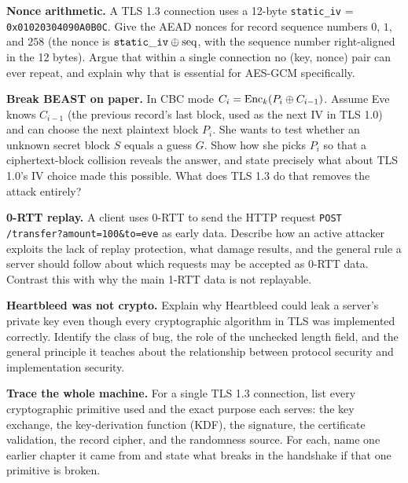 \begin{exercise}
\textbf{Nonce arithmetic.} A TLS 1.3 connection uses a 12-byte
\texttt{static\_iv} = \texttt{0x01020304\allowbreak 090A0B0C}. Give the AEAD nonces
for record sequence numbers $0$, $1$, and $258$ (the nonce is
$\mathtt{static\_iv} \oplus \mathrm{seq}$, with the sequence number right-aligned in
the 12 bytes). Argue that within a single connection no (key, nonce) pair can ever
repeat, and explain why that is essential for AES-GCM specifically.
\end{exercise}

\begin{exercise}
\textbf{Break BEAST on paper.} In CBC mode $C_i = \operatorname{Enc}_k(P_i \oplus C_{i-1})$.
Assume Eve knows $C_{i-1}$ (the previous record's last block, used as the next IV
in TLS 1.0) and can choose the next plaintext block $P_i$. She wants to test
whether an unknown secret block $S$ equals a guess $G$. Show how she picks $P_i$ so
that a ciphertext-block collision reveals the answer, and state precisely what
about TLS 1.0's IV choice made this possible. What does TLS 1.3 do that removes the
attack entirely?
\end{exercise}

\begin{exercise}
\textbf{0-RTT replay.} A client uses 0-RTT to send the HTTP request
\texttt{POST /transfer?}\allowbreak\texttt{amount=100\&to=eve} as early data. Describe how an active
attacker exploits the lack of replay protection, what damage results, and the
general rule a server should follow about which requests may be accepted as 0-RTT
data. Contrast this with why the main 1-RTT data is not replayable.
\end{exercise}

\begin{exercise}
\textbf{Heartbleed was not crypto.} Explain why Heartbleed could leak a server's
private key even though every cryptographic algorithm in TLS was implemented
correctly. Identify the class of bug, the role of the unchecked length field, and
the general principle it teaches about the relationship between protocol security
and implementation security.
\end{exercise}

\begin{exercise}
\textbf{Trace the whole machine.} For a single TLS 1.3 connection, list every
cryptographic primitive used and the exact purpose each serves: the key exchange,
the key-derivation function (KDF), the signature, the certificate validation, the
record cipher, and the randomness source. For each, name one earlier chapter it
came from and state what breaks in the handshake if that one primitive is broken.
\end{exercise}
